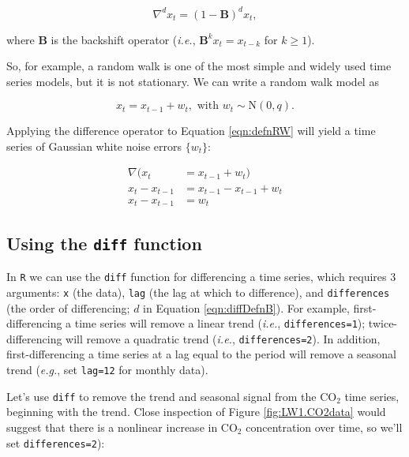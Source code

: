 \begin{equation}\label{eqn:diffDefnB}
\nabla^d x_t = (1-\textbf{B})^d x_t,
\end{equation}

\noindent where \textbf{B} is the backshift operator (\emph{i.e.}, $\textbf{B}^k x_t = x_{t-k}$ for $k \geq 1$).

So, for example, a random walk is one of the most simple and widely used time series models, but it is not stationary.  We can write a random walk model as

\begin{equation}\label{eqn:defnRW}
  x_t = x_{t-1} + w_t, \text{ with } w_t \sim \text{N}(0,q).
\end{equation}

\noindent Applying the difference operator to Equation \eqref{eqn:defnRW} will yield a time series of Gaussian white noise errors $\{w_t\}$:

\begin{equation}\label{eqn:diffRW}
  \begin{aligned}
    \nabla (x_t &= x_{t-1} + w_t) \\
    x_t - x_{t-1} &= x_{t-1} - x_{t-1} + w_t \\
    x_t - x_{t-1} &= w_t
  \end{aligned}
\end{equation}

\subsection{Using the \texttt{diff} function}

In \texttt{R} we can use the \texttt{diff} function for differencing a time series, which requires 3 arguments: \texttt{x} (the data), \texttt{lag} (the lag at which to difference), and \texttt{differences} (the order of differencing; $d$ in Equation \eqref{eqn:diffDefnB}).  For example, first-differencing a time series will remove a linear trend (\emph{i.e.}, \texttt{differences=1}); twice-differencing will remove a quadratic trend (\emph{i.e.}, \texttt{differences=2}).  In addition, first-differencing a time series at a lag equal to the period will remove a seasonal trend (\emph{e.g.}, set \texttt{lag=12} for monthly data).

Let's use \texttt{diff} to remove the trend and seasonal signal from the CO$_2$ time series, beginning with the trend.  Close inspection of Figure \ref{fig:LW1.CO2data} would suggest that there is a nonlinear increase in CO$_2$ concentration over time, so we'll set \texttt{differences=2}):
  
